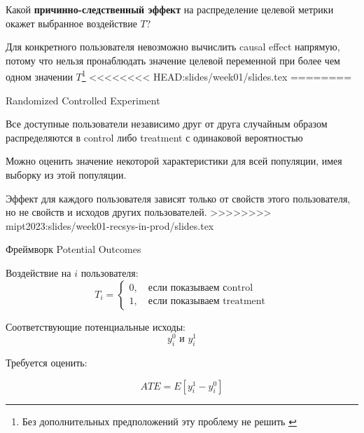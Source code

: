 \documentclass[11pt,aspectratio=169,handout]{beamer}
\begin{document}
\begin{frame}{}

\begin{tcolorbox}[colback=info!5,colframe=info!80,title=Задача]
Какой {\bf причинно-следственный эффект} на распределение целевой метрики окажет выбранное воздействие $T$?
\end{tcolorbox}

\vfill

\begin{tcolorbox}[colback=warn!5,colframe=warn!80,title=Фундаментальная Проблема Causal Inference]
Для конкретного пользователя невозможно вычислить causal effect напрямую, потому что нельзя пронаблюдать значение целевой переменной при более чем одном значении $T$\footnote{Без дополнительных предположений эту проблему не решить \cite{GELMAN}}
<<<<<<<< HEAD:slides/week01/slides.tex
========
\end{tcolorbox}

\end{frame}

\begin{frame}{Randomized Controlled Experiment}

\begin{tcolorbox}[colback=info!5,colframe=info!80,title=Схема эксперимента]
Все доступные пользователи независимо друг от друга случайным образом распределяются в control либо treatment с одинаковой вероятностью
\end{tcolorbox}

\begin{tcolorbox}[colback=gray!5,colframe=gray!80,title=Предположение 1: ]
Можно оценить значение некоторой характеристики для всей популяции, имея выборку из этой популяции.
\end{tcolorbox}

\begin{tcolorbox}[colback=gray!5,colframe=gray!80,title=Предположение 2: Stable Unit Treatment Value Assumption]
Эффект для каждого пользователя зависят только от свойств этого пользователя, но не свойств и исходов других пользователей.
>>>>>>>> mipt2023:slides/week01-recsys-in-prod/slides.tex
\end{tcolorbox}

\end{frame}

\begin{frame}{Фреймворк Potential Outcomes}

Воздействие на $i$ пользователя:
\[
T_i = \begin{cases}
0, \quad \text{если показываем сontrol} \\
1, \quad \text{если показываем treatment}
\end{cases}
\]

Соответствующие потенциальные исходы:
\[
y_i^0 \text{ и } y_i^1
\]

Требуется оценить:
\begin{tcolorbox}[colback=info!5,colframe=info!80,title=Average Treatment Effect,center,width=6cm,center title]
\[
ATE = E \left[ y_i^1 - y_i^0 \right]
\]
\end{tcolorbox}

\end{frame}
\end{document}
